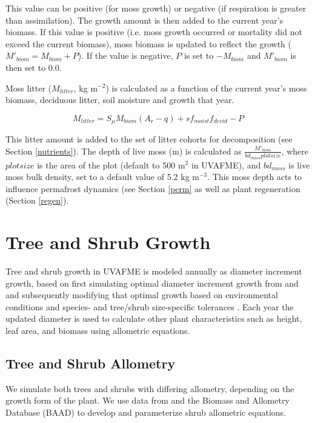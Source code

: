 \documentclass[a4paper, 12pt] {report}
\begin{document}
This value can be positive (for moss growth) or negative (if respiration is greater than assimilation). The growth amount is then added to the current year's biomass. If this value is positive (i.e. moss growth occurred or mortality did not exceed the current biomass), moss biomass is updated to reflect the growth ($M'_{biom} = M_{biom} + P$). If the value is negative, $P$ is set to $-M_{biom}$ and $M'_{biom}$ is then set to 0.0.

Moss litter ($M_{litter}$, kg m$^{-2}$) is calculated as a function of the current year's moss biomass, deciduous litter, soil moisture and growth that year.

\begin{equation}
M_{litter} = S_\mu M_{biom}(A_r - q) + sf_{moist}f_{decid} - P
\end{equation}

This litter amount is added to the set of litter cohorts for decomposition (see Section \ref{nutrients}). The depth of live moss (m) is calculated as $\frac{M'_{biom}}{bd_{moss}plotsize}$, where $plotsize$ is the area of the plot (default to 500 m$^2$ in UVAFME), and $bd_{moss}$ is live moss bulk density, set to a default value of 5.2 kg m$^{-3}$. This moss depth acts to influence permafrost dynamics (see Section \ref{perm} as well as plant regeneration (Section \ref{regen}).

\section{Tree and Shrub Growth} \label{growth}

Tree and shrub growth in UVAFME is modeled annually as diameter increment growth, based on first simulating optimal diameter increment growth from  and  and subsequently modifying that optimal growth based on environmental conditions and species- and tree/shrub size-specific tolerances \cite{yanFAREASTForestGap2005}. Each year the updated diameter is used to calculate other plant characteristics such as height, leaf area, and biomass using allometric equations.

\subsection{Tree and Shrub Allometry} \label{allometry}

We simulate both trees and shrubs with differing allometry, depending on the growth form of the plant. We use data from  and the Biomass and Allometry Database (BAAD) \cite{falsterBAADBiomassAllometry2015} to develop and parameterize shrub allometric equations.
\end{document}
